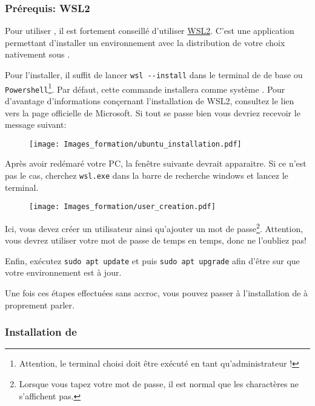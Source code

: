    \subsubsection[Prérequis][fr.wikipedia.org/wiki/Windows_Subsystem_for_Linux]{Prérequis: WSL2}

    Pour utiliser \dockerdesktop, il est fortement conseillé d'utiliser \href{https://learn.microsoft.com/fr-fr/windows/wsl/install}{WSL2}. C'est une application \windows{} permettant d'installer un environnement \linux{} avec la distribution de votre choix nativement sous \windows{}. 

    Pour l'installer, il suffit de lancer \verb|wsl --install| dans le terminal de \windows{} de base ou \texttt{Powershell}\footnote{Attention, le terminal choisi doit être exécuté en tant qu'administrateur !}. Par défaut, cette commande installera \ubuntu{} comme système \linux. Pour d'avantage d'informations conçernant l'installation de WSL2, consultez le lien vers la page officielle de Microsoft. Si tout se passe bien vous devriez recevoir le message suivant:

    \begin{figure}[!th]
        \centering
        \texttt{[image: Images\_formation/ubuntu\_installation.pdf]}
    \end{figure}

    Après avoir redémaré votre PC, la fenêtre suivante devrait apparaitre. Si ce n'est pas le cas, cherchez \texttt{wsl.exe} dans la barre de recherche windows et lancez le terminal.

    \begin{figure}[!th]
        \centering
        \texttt{[image: Images\_formation/user\_creation.pdf]}
    \end{figure}

    Ici, vous devez créer un utilisateur ainsi qu'ajouter un mot de passe\footnote{Lorsque vous tapez votre mot de passe, il est normal que les charactères ne s'affichent pas.}. Attention, vous devrez utiliser votre mot de passe de temps en temps, donc ne l'oubliez pas!

    Enfin, exécutez \verb|sudo apt update| et puis \verb|sudo apt upgrade| afin d'être sur que votre environnement est à jour.

    Une fois ces étapes effectuées sans accroc, vous pouvez passer à l'installation de \dockerdesktop{} à proprement parler.

    \subsubsection[Installation de Docker Desktop]{Installation de \dockerdesktop}
    
